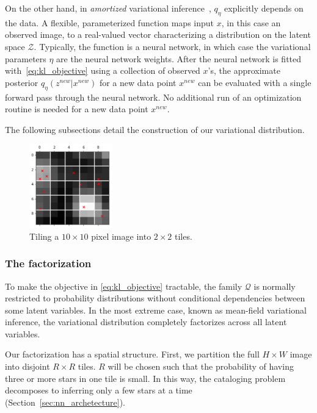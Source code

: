 On the other hand, 
in {\itshape amortized} variational
inference~\citep{kingma2013autoencoding, rezende2014stochastic}, $q_\eta$ explicitly depends on the data. 
A flexible, parameterized function maps input $x$, in this case an observed image, to a real-valued vector characterizing a distribution on the latent space $\mathcal{Z}$. 
Typically, the function is a neural network, in which case the variational parameters $\eta$ are the neural network weights. 
After the neural network is fitted with~\eqref{eq:kl_objective} using a collection of observed $x$'s, the approximate posterior $q_\eta(z^{new} | x^{new})$ for a new data point 
$x^{new}$ can be evaluated with a single forward pass through the neural network. 
No additional run of an optimization routine is needed for a new data point $x^{new}$. 

The following subsections detail the construction of our variational distribution.

\begin{figure}
\vspace{-4em}
    \centering
    \includegraphics[width = 0.32\textwidth]{figures/vi_figures/example_tiled_less_whitespace.png}
    \caption{Tiling a $10 \times 10$ pixel image into $2 \times 2$ tiles.}
    \label{fig:ex_tiles}
    \vspace{-1em}
\end{figure}


\subsubsection{The factorization}
\label{sec:factorization}
To make the objective in \eqref{eq:kl_objective} tractable, the family $\mathcal{Q}$ is normally restricted to probability distributions 
without conditional dependencies between some latent variables. In the most extreme case, known as mean-field variational inference, the variational distribution completely factorizes across all latent variables. 

Our factorization has a spatial structure. 
First, we partition the full $H \times W$ image into disjoint $R \times R$ tiles. 
$R$ will be chosen such that the probability of having three or more stars in one tile is small. 
In this way, the cataloging problem decomposes to inferring only a few stars at a time (Section~\ref{sec:nn_archetecture}). 


